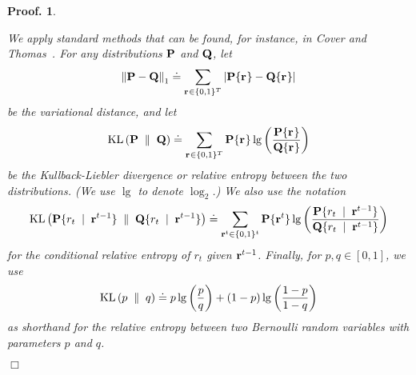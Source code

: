 \documentclass[12pt]{article}
\newcommand{\paren}[1]{\left({#1}\right)}
\newtheorem{pproof}{Proof.}
\newenvironment{proof}{
\begin{pproof}
        \begin{rm}\begin{rm}}{
        \hspace*{\fill} $\Box$
        \end{rm}\end{rm}
        \end{pproof}
}
\newcommand{\distcom}[2]{#1 \{#2\}}
\newcommand{\Pdd}{{\bf P}}
\newcommand{\Qdd}{{\bf Q}}
\newcommand{\Pd}[1]{\distcom{\Pdd}{#1}}  %
\newcommand{\Qd}[1]{\distcom{\Qdd}{#1}}  %
\renewcommand{\r}[1]{{r_{#1}}}
\newcommand{\rvec}[1]{{{\bf r}^{#1}}}
\newcommand{\rv}{\rvec{}}
\newcommand{\given}{\;\mid\;}
\newcommand{\vardist}[2]{{\left\|{#1}-{#2}\right\|_1}}
\newcommand{\kldist}[2]{{{\rm KL}\paren{{#1} \;\parallel\; {#2}}}}
\begin{document}
\begin{proof}
We apply standard methods that can be found, for instance, in Cover
and Thomas~\cite{CoverTh91}.
For any distributions $\Pdd$ and $\Qdd$, let
\[
\vardist{\Pdd}{\Qdd} \doteq \sum_{\rv\in\{0,1\}^T} |\Pd{\rv} - \Qd{\rv}|
\]
be the variational distance, and let
\[
\kldist{\Pdd}{\Qdd} \doteq  \sum_{\rv\in\{0,1\}^T}
      \Pd{\rv}\lg\paren{\frac{\Pd{\rv}}{\Qd{\rv}}}
\]
be the Kullback-Liebler divergence or relative entropy between the two
distributions.
(We use $\lg$ to denote $\log_2$.)
We also use the notation
\[\kldist{ \Pd{\r{t} \given \rvec{t-1}}}{ \Qd{\r{t} \given \rvec{t-1}}}
   \doteq \sum_{\rvec{t}\in\{0,1\}^{t}}
         \Pd{\rvec{t}} \lg \paren{\frac{\Pd{\r{t} \given \rvec{t-1}}}
                                       {\Qd{\r{t} \given \rvec{t-1}}}}
\]
for the conditional relative entropy of $\r{t}$ given $\rvec{t-1}$.
Finally, for $p,q\in [0,1]$, we use
\[
\kldist{p}{q} \doteq p \lg\paren{\frac{p}{q}}
                + (1-p) \lg\paren{\frac{1-p}{1-q}}
\]
as shorthand for the
relative entropy between two Bernoulli random variables with
parameters $p$ and $q$.


\end{proof}
\end{document}
